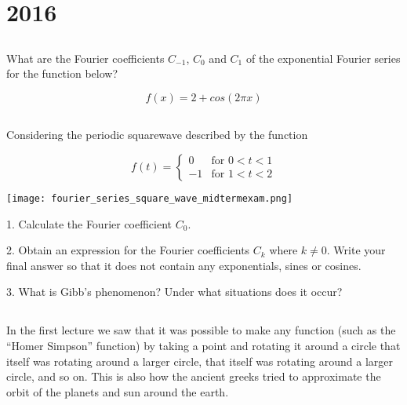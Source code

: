\section{2016}
\subsection{}

What are the Fourier coefficients $C_{-1}$, $C_{0}$ and $C_{1}$ of the exponential Fourier series for the function below?

\begin{equation}
  f(x)=2+cos(2 \pi x)
\end{equation}




\subsection{}

Considering the periodic squarewave described by the function

\begin{equation}
    f(t)=
    \begin{cases}
        0 & \text{for } 0<t<1 \\
        -1 & \text{for } 1<t<2
    \end{cases}
\end{equation}

\begin{center}
\texttt{[image: fourier\_series\_square\_wave\_midtermexam.png]}
\end{center}

1. Calculate the Fourier coefficient $C_0$.

2. Obtain an expression for the Fourier coefficients $C_k$ where $k \ne 0$. Write your final answer so that it does not contain any exponentials, sines or cosines.

3. What is Gibb's phenomenon? Under what situations does it occur?




\subsection{}

In the first lecture we saw that it was possible to make any function (such as the ``Homer Simpson'' function) by taking a point and rotating it around a circle that itself was rotating around a larger circle, that itself was rotating around a larger circle, and so on. This is also how the ancient greeks tried to approximate the orbit of the planets and sun around the earth.

